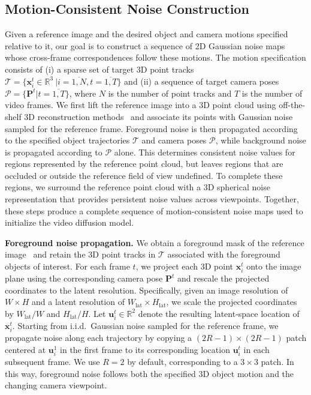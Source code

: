 \ifdefined\arxivbuild\else\documentclass{article}\fi %
\begin{document}
\subsection{Motion-Consistent Noise Construction}
\label{sec:noise_construction}

Given a reference image and the desired object and camera motions specified relative to it, our goal is to construct a sequence of 2D Gaussian noise maps whose cross-frame correspondences follow these motions. The motion specification consists of (i) a sparse set of target 3D point tracks $\mathcal{T}=\{\mathbf{x}_i^t\in\mathbb{R}^3\ | {i=\overline{1,N},t=\overline{1,T}}\}$ and (ii) a sequence of target camera poses $\mathcal{P}=\{\mathbf{P}^t | {t=\overline{1,T}}\}$, where $N$ is the number of point tracks and $T$ is the number of video frames. We first lift the reference image into a 3D point cloud using off-the-shelf 3D reconstruction methods~\cite{huang2025vipe,li2025megasam,wang2026vggtomega} and associate its points with Gaussian noise sampled for the reference frame.
Foreground noise is then propagated according to the specified object trajectories $\mathcal{T}$ and camera poses $\mathcal{P}$, while background noise is propagated according to $\mathcal{P}$ alone. This determines consistent noise values for regions represented by the reference point cloud, but leaves regions that are occluded or outside the reference field of view undefined. To complete these regions, we surround the reference point cloud with a 3D spherical noise representation that provides persistent noise values across viewpoints. Together, these steps produce a complete sequence of motion-consistent noise maps used to initialize the video diffusion model.



\noindent\textbf{Foreground noise propagation.}
We obtain a foreground mask of the reference image~\citep{carion2025sam3segmentconcepts} and retain the 3D point tracks in $\mathcal{T}$ associated with the foreground objects of interest. For each frame $t$, we project each 3D point $\mathbf{x}_i^t$ onto the image plane using the corresponding camera pose $\mathbf{P}^t$ and rescale the projected coordinates to the latent resolution. Specifically, given an image resolution of $W{\times}H$ and a latent resolution of $W_{\mathrm{lat}}{\times}H_{\mathrm{lat}}$, we scale the projected coordinates by $W_{\mathrm{lat}}/W$ and $H_{\mathrm{lat}}/H$. Let $\mathbf{u}_i^t\in\mathbb{R}^2$ denote the resulting latent-space location of $\mathbf{x}_i^t$. Starting from i.i.d.\ Gaussian noise sampled for the reference frame, we propagate noise along each trajectory by copying a $(2R-1){\times}(2R-1)$ patch centered at $\mathbf{u}_i^1$ in the first frame to its corresponding location $\mathbf{u}_i^t$ in each subsequent frame. We use $R=2$ by default, corresponding to a $3{\times}3$ patch. In this way, foreground noise follows both the specified 3D object motion and the changing camera viewpoint.
\end{document}
